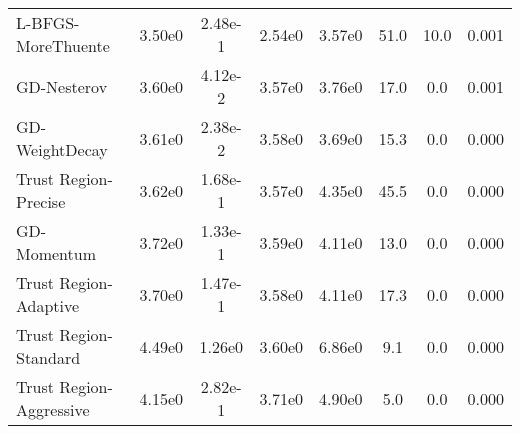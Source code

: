 \documentclass{article}
\begin{document}
\begin{table}[htbp]
{\begin{tabular}{p{2.5cm}*{7}{c}}
L-BFGS-MoreThuente & 3.50e0 & 2.48e-1 & 2.54e0 & 3.57e0 & 51.0 & 10.0 & 0.001 \\
GD-Nesterov & 3.60e0 & 4.12e-2 & 3.57e0 & 3.76e0 & 17.0 & 0.0 & 0.001 \\
GD-WeightDecay & 3.61e0 & 2.38e-2 & 3.58e0 & 3.69e0 & 15.3 & 0.0 & 0.000 \\
Trust Region-Precise & 3.62e0 & 1.68e-1 & 3.57e0 & 4.35e0 & 45.5 & 0.0 & 0.000 \\
GD-Momentum & 3.72e0 & 1.33e-1 & 3.59e0 & 4.11e0 & 13.0 & 0.0 & 0.000 \\
Trust Region-Adaptive & 3.70e0 & 1.47e-1 & 3.58e0 & 4.11e0 & 17.3 & 0.0 & 0.000 \\
Trust Region-Standard & 4.49e0 & 1.26e0 & 3.60e0 & 6.86e0 & 9.1 & 0.0 & 0.000 \\
Trust Region-Aggressive & 4.15e0 & 2.82e-1 & 3.71e0 & 4.90e0 & 5.0 & 0.0 & 0.000 \\
\bottomrule
\end{tabular}
}
\end{table}
\end{document}
